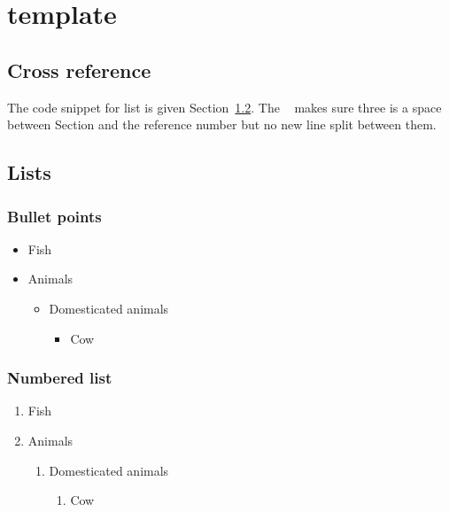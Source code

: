 \chapter{template}

\section{Cross reference} \label{template_cross_reference}

The code snippet for list is given Section~\ref{template_list}.
The \texttt{~} makes sure three is a space between Section and the reference number but no new line split between them.



\section{Lists} \label{template_list}

\subsection{Bullet points}
\begin{itemize}
  \item Fish
  \item Animals
  \begin{itemize}
    \item Domesticated animals
    \begin{itemize}
      \item Cow
    \end{itemize}
  \end{itemize}
\end{itemize}
  
\subsection{Numbered list}

\begin{enumerate}
  \item Fish
  \item Animals
  \begin{enumerate}
    \item Domesticated animals
    \begin{enumerate}
      \item Cow
    \end{enumerate}
  \end{enumerate}
\end{enumerate}

